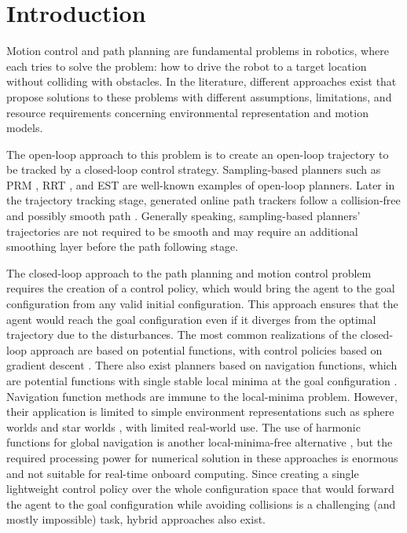\chapter{Introduction}
\label{chapter:introduction}

Motion control and path planning are fundamental problems in robotics, where each tries to solve the problem: how to drive the robot to a target location without colliding with obstacles.
In the literature, different approaches exist that propose solutions to these problems with different assumptions, limitations, and resource requirements concerning environmental representation and motion models.

The open-loop approach to this problem is to create an open-loop trajectory to be tracked by a closed-loop control strategy. Sampling-based planners such as PRM \cite{Kavraki1996}, RRT \cite{rrt2001}, and EST \cite{Est1999} are well-known examples of open-loop planners.
Later in the trajectory tracking stage, generated online path trackers follow a collision-free and possibly smooth path \cite{camacho2004} \cite{Amidi1991}.
Generally speaking, sampling-based planners' trajectories are not required to be smooth and may require an additional smoothing layer before the path following stage. %

The closed-loop approach to the path planning and motion control problem requires the creation of a control policy, which would bring the agent to the goal configuration from any valid initial configuration.
This approach ensures that the agent would reach the goal configuration even if it diverges from the optimal trajectory due to the disturbances.
The most common realizations of the closed-loop approach are based on potential functions, with control policies based on gradient descent \cite{Khatib1986}. %
There also exist planners based on navigation functions, which are potential functions with single stable local minima at the goal configuration \cite{KODITSCHEK1990412}.
Navigation function methods are immune to the local-minima problem. However, their application is limited to simple environment representations such as sphere worlds and star worlds \cite{Rimon1992}, with limited real-world use.
The use of harmonic functions for global navigation is another local-minima-free alternative \cite{Connolly1990} \cite{Golan2017}, but the required processing power for numerical solution in these approaches is enormous and not suitable for real-time onboard computing.
Since creating a single lightweight control policy over the whole configuration space that would forward the agent to the goal configuration while avoiding collisions is a challenging (and mostly impossible) task, hybrid approaches also exist.

